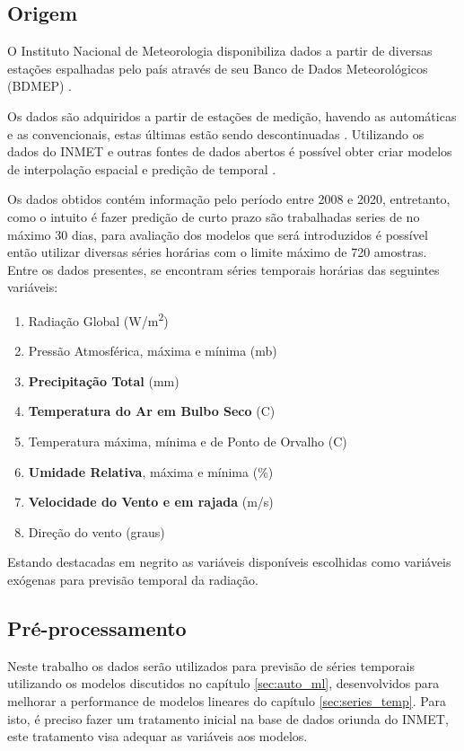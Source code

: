 \subsection{Origem}
\label{subsec:orig_data}

O Instituto Nacional de Meteorologia disponibiliza dados a partir de diversas estações espalhadas pelo país através de seu Banco de Dados Meteorológicos (BDMEP) \cite{INMET}.

Os dados são adquiridos a partir de estações de medição, havendo as automáticas e as convencionais, estas últimas estão sendo descontinuadas \cite{lima2020comparaccao}. Utilizando os dados do INMET e outras fontes de dados abertos é possível obter criar modelos de interpolação espacial e predição de temporal \cite{mendes2020integraccao}.

Os dados obtidos contém informação pelo período entre 2008 e 2020, entretanto, como o intuito é fazer predição de curto prazo são trabalhadas series de no máximo 30 dias, para avaliação dos modelos que será introduzidos é possível então utilizar diversas séries horárias com o limite máximo de 720 amostras. Entre os dados presentes, se encontram séries temporais horárias das seguintes variáveis:

\begin{enumerate}
    \item Radiação Global (W/m\textsuperscript{2})
    \item Pressão Atmosférica, máxima e mínima (mb)
    \item \textbf{Precipitação Total} (mm)
    \item \textbf{Temperatura do Ar em Bulbo Seco} (\textdegree{}C)
    \item Temperatura máxima, mínima e de Ponto de Orvalho (\textdegree{}C)
    \item \textbf{Umidade Relativa}, máxima e mínima (\%)
    \item \textbf{Velocidade do Vento e em rajada} (m/s)
    \item Direção do vento (graus)
\end{enumerate}

Estando destacadas em negrito as variáveis disponíveis escolhidas como variáveis exógenas para previsão temporal da radiação.

\subsection{Pré-processamento}

Neste trabalho os dados serão utilizados para previsão de séries temporais utilizando os modelos discutidos no capítulo \ref{sec:auto_ml}, desenvolvidos para melhorar a performance de modelos lineares do capítulo \ref{sec:series_temp}. Para isto, é preciso fazer um tratamento inicial na base de dados oriunda do INMET, este tratamento visa adequar as variáveis aos modelos. 

